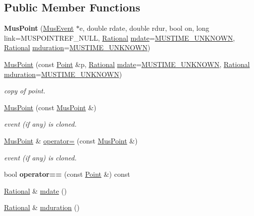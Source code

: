 \subsection*{Public Member Functions}
\begin{DoxyCompactItemize}
\item 
{\bfseries Mus\+Point} (\mbox{\hyperlink{classMusEvent}{Mus\+Event}} $\ast$e, double rdate, double rdur, bool on, long link=M\+U\+S\+P\+O\+I\+N\+T\+R\+E\+F\+\_\+\+N\+U\+LL, \mbox{\hyperlink{classRational}{Rational}} \mbox{\hyperlink{classMusPoint_a88d1f2efdc00dc80985bbe76356099b2}{mdate}}=\mbox{\hyperlink{group__general_gae862a9d955eb3154601efb64980ac24b}{M\+U\+S\+T\+I\+M\+E\+\_\+\+U\+N\+K\+N\+O\+WN}}, \mbox{\hyperlink{classRational}{Rational}} \mbox{\hyperlink{classMusPoint_a2f89f6b4930b75e633d8b3cd3e461aa2}{mduration}}=\mbox{\hyperlink{group__general_gae862a9d955eb3154601efb64980ac24b}{M\+U\+S\+T\+I\+M\+E\+\_\+\+U\+N\+K\+N\+O\+WN}})
\item 
\mbox{\hyperlink{group__segment_ga1bb17bef698401de18bc814c7f965999}{Mus\+Point}} (const \mbox{\hyperlink{classPoint}{Point}} \&p, \mbox{\hyperlink{classRational}{Rational}} \mbox{\hyperlink{classMusPoint_a88d1f2efdc00dc80985bbe76356099b2}{mdate}}=\mbox{\hyperlink{group__general_gae862a9d955eb3154601efb64980ac24b}{M\+U\+S\+T\+I\+M\+E\+\_\+\+U\+N\+K\+N\+O\+WN}}, \mbox{\hyperlink{classRational}{Rational}} \mbox{\hyperlink{classMusPoint_a2f89f6b4930b75e633d8b3cd3e461aa2}{mduration}}=\mbox{\hyperlink{group__general_gae862a9d955eb3154601efb64980ac24b}{M\+U\+S\+T\+I\+M\+E\+\_\+\+U\+N\+K\+N\+O\+WN}})
\begin{DoxyCompactList}\small\item\em copy of point. \end{DoxyCompactList}\item 
\mbox{\hyperlink{group__segment_ga5f00500846d251b165f48a41552be18e}{Mus\+Point}} (const \mbox{\hyperlink{classMusPoint}{Mus\+Point}} \&)
\begin{DoxyCompactList}\small\item\em event (if any) is cloned. \end{DoxyCompactList}\item 
\mbox{\hyperlink{classMusPoint}{Mus\+Point}} \& \mbox{\hyperlink{group__segment_ga522126acc9eb79e737068941370bb172}{operator=}} (const \mbox{\hyperlink{classMusPoint}{Mus\+Point}} \&)
\begin{DoxyCompactList}\small\item\em event (if any) is cloned. \end{DoxyCompactList}\item 
bool {\bfseries operator==} (const \mbox{\hyperlink{classPoint}{Point}} \&) const
\item 
\mbox{\hyperlink{classRational}{Rational}} \& \mbox{\hyperlink{classMusPoint_a88d1f2efdc00dc80985bbe76356099b2}{mdate}} ()
\item 
\mbox{\hyperlink{classRational}{Rational}} \& \mbox{\hyperlink{classMusPoint_a2f89f6b4930b75e633d8b3cd3e461aa2}{mduration}} ()
\end{DoxyCompactItemize}
